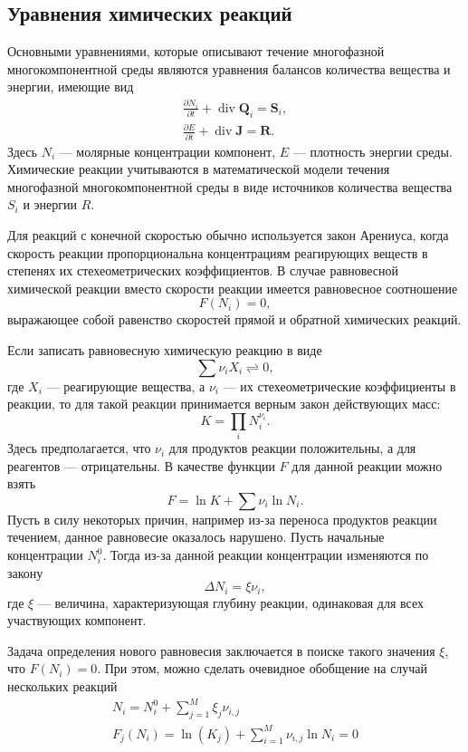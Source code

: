 \documentclass[14pt,a4paper]{extarticle}
\newcommand{\pd}[2]{\frac{\partial #1}{\partial #2}}
\renewcommand{\div}{\operatorname{div}}
\renewcommand{\vec}[1]{\boldsymbol{\mathbf{#1}}}
\begin{document}
\subsection{Уравнения химических реакций}

Основными уравнениями, которые описывают течение многофазной многокомпонентной среды являются уравнения балансов количества вещества и энергии, имеющие вид
\begin{gather*}
\pd{N_i}{t} + \div \vec Q_i = \vec S_i,\\
\pd{E}{t} + \div \vec J = \vec R.
\end{gather*}
Здесь $N_i$ --- молярные концентрации компонент, $E$ --- плотность энергии среды. Химические реакции учитываются в математической модели течения многофазной многокомпонентной среды в виде источников количества вещества $S_i$ и энергии $R$.

Для реакций с конечной скоростью обычно используется закон Арениуса, когда скорость реакции пропорциональна концентрациям реагирующих веществ в степенях их стехеометрических коэффициентов.
В случае равновесной химической реакции вместо скорости реакции имеется равновесное соотношение
$$F(N_i) = 0,$$
выражающее собой равенство скоростей прямой и обратной химических реакций.

Если записать равновесную химическую реакцию в виде 
$$\sum{\nu_i X_i} \rightleftharpoons 0,$$
где $X_i$ --- реагирующие вещества, а $\nu_i$ --- их стехеометрические коэффициенты в реакции, то для такой реакции принимается верным закон действующих масс:
$$
K = \prod_i N_i^{\nu_i}.
$$
Здесь предполагается, что $\nu_i$ для продуктов реакции положительны, а для реагентов --- отрицательны. В качестве функции $F$ для данной реакции можно взять 
$$F = \ln{K} + \sum{\nu_i \ln{N_i}}.$$
Пусть в силу  некоторых причин, например из-за переноса продуктов реакции течением, данное равновесие оказалось нарушено. Пусть начальные концентрации $N_i^0$. Тогда из-за данной реакции концентрации изменяются по закону $$\Delta N_i = \xi \nu_i,$$ где $\xi$ --- величина, характеризующая глубину реакции, одинаковая для всех участвующих компонент.

Задача определения нового равновесия заключается в поиске такого значения $\xi$, что $F(N_i) = 0$. При этом, можно сделать очевидное обобщение на случай нескольких реакций
\begin{gather*}
N_i = N_i^0 + \sum_{j=1}^{M} \xi_j\nu_{i,j}\\
F_j(N_i)=\ln(K_j) + \sum_{i=1}^{M} \nu_{i,j}\ln{N_i} = 0
\end{gather*}
 
\end{document}
